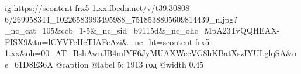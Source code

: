  
 
 
 
 

\ifcmt
  ig https://scontent-frx5-1.xx.fbcdn.net/v/t39.30808-6/269958344_10226583993495988_7518538805609814439_n.jpg?_nc_cat=105&ccb=1-5&_nc_sid=b9115d&_nc_ohc=MpA23TvQQHEAX-FISX9&tn=lCYVFeHcTIAFcAzi&_nc_ht=scontent-frx5-1.xx&oh=00_AT_BshAwnJB4mfYF6JyMUAXWecVG8hKBatXszIYULglqSA&oe=61D8E36A
	@caption @label 5: 1913 год
  @width 0.45
\fi
